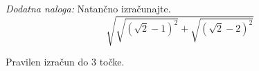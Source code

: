 \documentclass[addpoints,12pt]{exam}
\begin{document}
\begin{questions}






     \newpage








        

    \bonusquestion[3]
    \textit{Dodatna naloga:} Natančno izračunajte. $$ \sqrt{\sqrt{\left(\sqrt{2}-1\right)^2}+\sqrt{\left(\sqrt{2}-2\right)^2}} $$

    \begin{solution}[7cm]
        Pravilen izračun do $3$ točke.
    \end{solution}




\end{questions}
\end{document}
